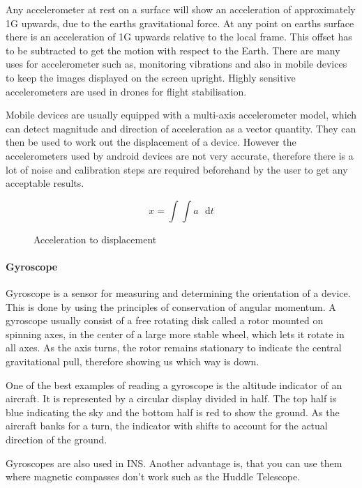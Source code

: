 Any accelerometer at rest on a surface will show an acceleration of
approximately 1G upwards\cite{accl-wiki}, due to the earths gravitational force. At
any point on earths surface there is an acceleration of 1G upwards
relative to the local frame. This offset has to be subtracted to get
the motion with respect to the Earth. There are many uses for accelerometer such as,
monitoring vibrations and also in mobile devices to
keep the images displayed on the screen upright. Highly sensitive
accelerometers are used in drones for flight stabilisation.

Mobile devices are usually equipped with a multi-axis accelerometer model,
which can detect magnitude and direction of acceleration as a
vector quantity. They can then be used to work out the displacement
of a device. However the accelerometers used by android devices
are not very accurate, therefore there is a lot of noise and calibration
steps are required beforehand by the user to get any acceptable results.

\begin{figure}[H]
\[
x=\int\int a\mathrm{\text{ }d}t
\]
 

\protect\caption{Acceleration to displacement}


\end{figure}



\paragraph{Gyroscope}

Gyroscope\cite{innertial_nav_sys} is a sensor for measuring and determining the orientation
of a device. This is done by using the principles of conservation
of angular momentum. A gyroscope usually consist of a free rotating
disk called a rotor mounted on spinning axes, in the center of a large
more stable wheel, which lets it rotate in all axes. As the axis
turns, the rotor remains stationary to indicate the central gravitational
pull, therefore showing us which way is down.

One of the best examples of reading a gyroscope is the altitude indicator
of an aircraft. It is represented by a circular display divided in
half. The top half is blue indicating the sky and the bottom half
is red to show the ground. As the aircraft banks for a turn, the indicator
with shifts to account for the actual direction of the ground.

Gyroscopes are also used in INS. Another advantage is, that
you can use them where magnetic compasses don't work such as the Huddle
Telescope\cite{gyroscope-wiki}.

